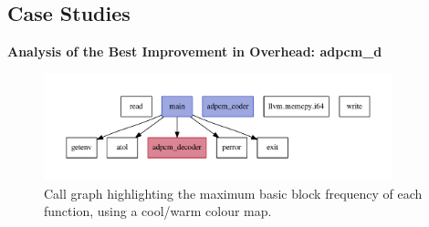 

\newpage
\subsection{Case Studies}

\noindent \textbf{Analysis of the Best Improvement in Overhead: {\flagstype adpcm\_d}}

\begin{figure}[htb]
    \centering
    \includegraphics[width=0.9\textwidth]{figs/adpcm_d-heat-callgraph.pdf}
    \caption{Call graph highlighting the maximum basic block frequency of each function, using a cool/warm colour map.}
    \label{fig:adpcm_d-heat-callgraph}
\end{figure}

